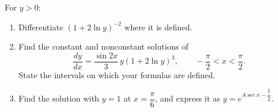 For $y>0$:
\begin{enumerate}
\item Differentiate $(1+2\ln y)^{-2}$ where it is defined.
\item Find the constant and nonconstant solutions of
\[
\dfrac{dy}{dx}=\dfrac{\sin2x}{3}\,y(1+2\ln y)^3,\qquad -\dfrac{\pi}{2}<x<\dfrac{\pi}{2}.
\]
State the intervals on which your formulas are defined.
\item Find the solution with $y=1$ at $x=\dfrac{\pi}{6}$, and express it as $y=e^{A\sec x-\dfrac{1}{2}}$.
\end{enumerate}
